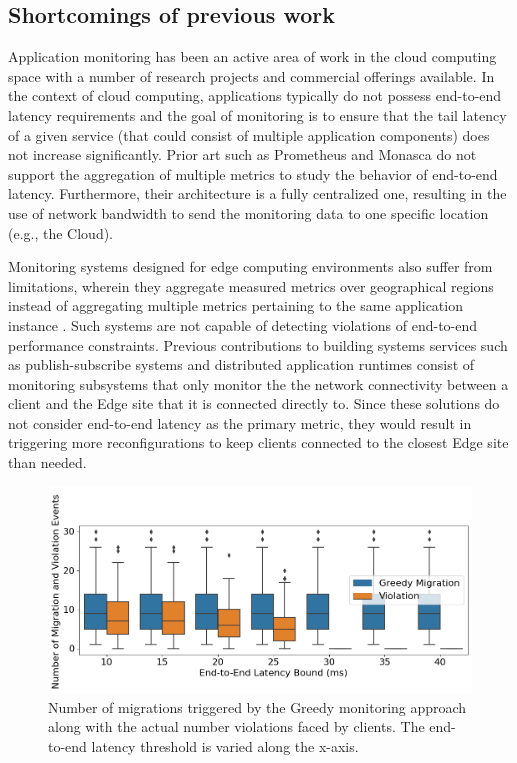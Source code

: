 \subsection{Shortcomings of previous work}
\label{sec:monitor_prev_work}
\par Application monitoring has been an active area of work in the cloud computing space with a number of research projects and commercial offerings available. In the context of cloud computing, applications typically do not possess end-to-end latency requirements and the goal of monitoring is to ensure that the tail latency of a given service (that could consist of multiple application components) does not increase significantly. Prior art such as Prometheus \cite{prometheus} and Monasca \cite{monasca} do not support the aggregation of multiple metrics to study the behavior of end-to-end latency. Furthermore, their architecture is a fully centralized one, resulting in the use of network bandwidth to send the monitoring data to one specific location (e.g., the Cloud).
\par Monitoring systems designed for edge computing environments also suffer from limitations, wherein they aggregate measured metrics over geographical regions instead of aggregating multiple metrics pertaining to the same application instance \cite{fmone, gonccalves2021dynamic}. Such systems are not capable of detecting violations of end-to-end performance constraints. Previous contributions to building systems services such as publish-subscribe systems \cite{emma} and distributed application runtimes \cite{foglets} consist of monitoring subsystems that only monitor the the network connectivity between a client and the Edge site that it is connected directly to. Since these solutions do not consider end-to-end latency as the primary metric, they would result in triggering more reconfigurations to keep clients connected to the closest Edge site than needed.
\begin{figure}
\centering
\includegraphics[width=0.75\linewidth]{figures/mechanisms/monitoring/migrations_count_greedy.png}
\caption{Number of migrations triggered by the Greedy monitoring approach along with the actual number violations faced by clients. The end-to-end latency threshold is varied along the x-axis.}
\label{fig:migration_count}
\end{figure}
